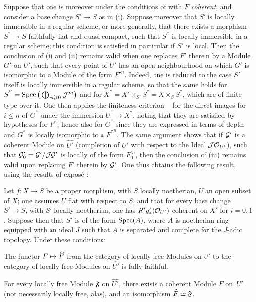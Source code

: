 \begin{remark} \label{XII.5.9}
Suppose that one is moreover under the conditions of  with $F$ \emph{coherent}, and consider a base change $S'\to S$ as in  (i). Suppose moreover that $S'$ is locally immersible in a regular scheme, or more generally, that there exists a morphism $S^{''}\to S$ faithfully flat and quasi-compact, such that $S^{''}$ is locally immersible in a regular scheme; this condition is satisfied in particular if $S'$ is local. Then the conclusion of  (i) and (ii) remains valid when one replaces $F'$ therein by a Module $G'$ on $U'$, such that every point of $U'$ has an open neighbourhood on which $G'$ is isomorphic to a Module of the form ${F'}^n$. Indeed, one is reduced to the case $S'$ itself is locally immersible in a regular scheme, so that the same holds for $S^{''}=\operatorname{Spec}\big(\bigoplus_{m\geqslant 0}{\mathcal J}^m\big)$ and for $X^{''}=X'\times_{S'} S^{''}= X\times_{S} S^{''}$, which are of finite type over it. One then applies the finiteness criterion ~ for the direct images for $i\leq n$ of $G^{''}$ under the immersion $U^{''}\to X^{''}$, noting that they are satisfied by hypotheses for $F^{''}$, hence also for $G^{''}$ since they are expressed in terms of depth and $G^{''}$ is locally isomorphic to a ${F^{''}}^n$. The same argument shows that if ${\mathcal G}'$ is a coherent Module on $\widehat{U'}$ (completion of $U'$ with respect to the Ideal ${\mathcal J}{\mathcal O}_{U'}$), such that ${\mathcal G}'_0={\mathcal G}'/{\mathcal J}{\mathcal G}'$ is locally of the form $F_0^{'n}$, then the conclusion of (iii) remains valid upon replacing $F'$ therein by ${\mathcal G}'$. One thus obtains the following result, using the results of expos\'e :
\end{remark}

\begin{corollary} \label{XII.5.10}
Let $f:X\to S$ be a proper morphism, with $S$ locally noetherian, $U$ an open subset of $X$; one assumes $U$ flat with respect to $S$, and that for every base change $S'\to S$, with $S'$ locally noetherian, one has $R^ig'_\ast({\mathcal O}_{U'})$ coherent on $X'$ for $i=0, 1$. Suppose then that $S'$ is of the form $\operatorname{Spec}(A)$, where $A$ is noetherian ring equipped with an ideal $J$ such that $A$ is separated and complete for the $J$-adic topology. Under these conditions:
\begin{enumeratei}
\item
The functor $F\mto\widehat{F}$ from the category of locally free Modules on $U'$ to the category of locally free Modules on $\widehat{U'}$ is fully faithful.
\item
For every locally free Module $\mathfrak{F}$ on $\widehat{U'}$, there exists a coherent Module $F$ on~$U'$ (not necessarily locally free, alas), and an isomorphism $\widehat{F}\simeq \mathfrak{F}$.
\end{enumeratei}
\end{corollary}

